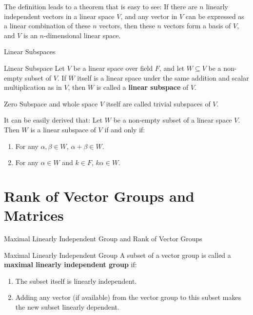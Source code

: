 \documentclass[11pt]{../../TexTemplate/elegantbook} %
\begin{document}
The definition leads to a theorem that is easy to see:
If there are \( n \) linearly independent vectors in a linear space \( V \),
and any vector in \( V \) can be expressed as a linear combination of these \( n \) vectors,
then these \( n \) vectors form a basis of \( V \), and \( V \) is an \( n \)-dimensional linear space.


\begin{leftbarTitle}{Linear Subspaces}\end{leftbarTitle}
\begin{definition}{Linear Subspace}
    Let \( V \) be a linear space over field \( F \), 
    and let \( W \subseteq V \) be a non-empty subset of \( V \).
    If \( W \) itself is a linear space under the same addition and scalar multiplication as in \( V \),
    then \( W \) is called a \textbf{linear subspace} of \( V \).
    
    Zero Subspace and whole space \( V \) itself are called trivial subspaces of \( V \).
\end{definition}

It can be easily derived that:
Let \(W\) be a non-empty subset of a linear space \(V\).
Then \(W\) is a linear subspace of \(V\) if and only if:
\begin{enumerate}
    \item For any \( \alpha, \beta \in W \), \( \alpha + \beta \in W \).
    \item For any \( \alpha \in W \) and \( k \in F \), \( k\alpha \in W \).
\end{enumerate}


\section{Rank of Vector Groups and Matrices}
\begin{leftbarTitle}{Maximal Linearly Independent Group and Rank of Vector Groups}\end{leftbarTitle}
\begin{definition}{Maximal Linearly Independent Group}
    A subset of a vector group is called a \textbf{maximal linearly independent group} if:
    \begin{enumerate}
        \item The subset itself is linearly independent.
        \item Adding any vector (if available) from the vector group to this subset makes the new subset linearly dependent.
    \end{enumerate}
\end{definition}
\end{document}
